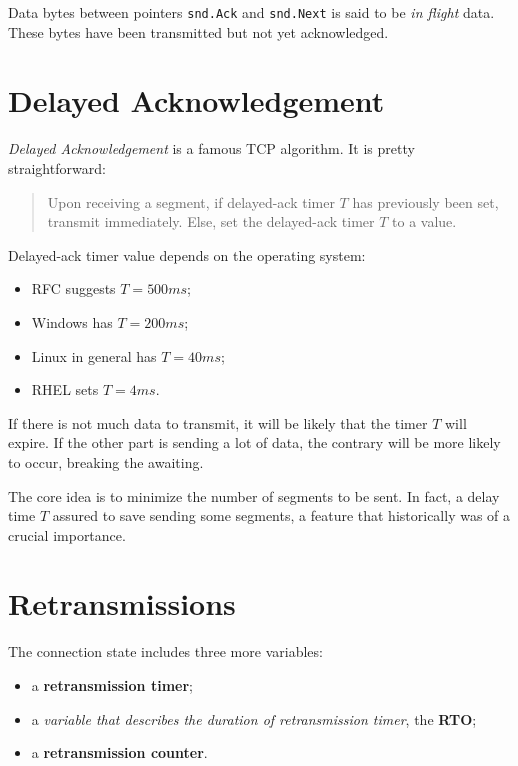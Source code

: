 \documentclass[a4paper, 11pt]{report}
\begin{document}
Data bytes between pointers \texttt{snd.Ack} and \texttt{snd.Next} is said to
be \emph{in flight} data. These bytes have been transmitted but not yet
acknowledged.

\section{Delayed Acknowledgement}

\emph{Delayed Acknowledgement} is a famous TCP algorithm. It is pretty
straightforward:

\begin{quote}
Upon receiving a segment, if delayed-ack timer $T$ has previously been set,
transmit immediately. Else, set the delayed-ack timer $T$ to a value.
\end{quote}

Delayed-ack timer value depends on the operating system:

\begin{itemize}
	\item RFC suggests $T = 500ms$;
	\item Windows has $T = 200ms$;
	\item Linux in general has $T = 40ms$;
	\item RHEL sets $T = 4ms$.
\end{itemize}

If there is not much data to transmit, it will be likely that the timer $T$
will expire. If the other part is sending a lot of data, the contrary will be
more likely to occur, breaking the awaiting.

The core idea is to minimize the number of segments to be sent. In fact, a
delay time $T$ assured to save sending some segments, a feature that
historically was of a crucial importance.

\section{Retransmissions}

The connection state includes three more variables:

\begin{itemize}
	\item a \textbf{retransmission timer};
	\item a \emph{variable that describes the duration of retransmission
		timer}, the \textbf{RTO};
	\item a \textbf{retransmission counter}.
\end{itemize}
\end{document}
